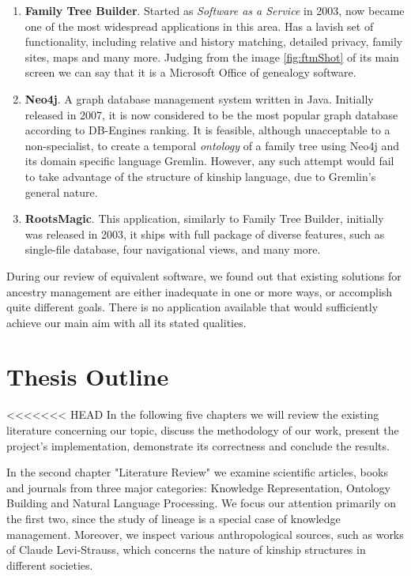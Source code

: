     \begin{enumerate}
        \item{\textbf{Family Tree Builder}. Started as \textit{Software as a Service} in 2003, now became one of the most
            widespread\cite{fambuild} applications in this area. Has a lavish set of functionality, including relative and history
            matching, detailed privacy, family sites, maps and many more. Judging from the image \ref{fig:ftmShot} of its main screen
            we can say that it is a Microsoft Office of genealogy software.}
        \item{\textbf{Neo4j}. A graph database management system\cite{neo4j} written in Java. Initially released in 2007, it is now considered
            to be the most popular graph database according to DB-Engines ranking\cite{rank}. It is feasible, although unacceptable to
            a non-specialist, to create a temporal \textit{ontology} of a family tree using Neo4j and its domain specific language
            Gremlin.  However, any such attempt would fail to take advantage of the structure of kinship language, due to Gremlin's
            general nature.}
        \item{\textbf{RootsMagic}. This application\cite{roots}, similarly to Family Tree Builder, initially was released in 2003, it
            ships with full package of diverse features, such as single-file database, four navigational views, and many more.}
    \end{enumerate}
    During our review of equivalent software, we found out that existing solutions for ancestry management are either inadequate in
    one or more ways, or accomplish quite different goals. There is no application available that would sufficiently achieve our
    main aim with all its stated qualities.

\section{Thesis Outline}
<<<<<<< HEAD
    In the following five chapters we will review the existing literature concerning our topic, discuss the methodology of our work,
    present the project's implementation, demonstrate its correctness and conclude the results.

    In the second chapter "Literature Review" we examine scientific articles, books and journals from three major categories:
    Knowledge Representation, Ontology Building and Natural Language Processing. We focus our attention primarily on the first two,
    since the study of lineage is a special case of knowledge management. Moreover, we inspect various anthropological sources, such
    as works of Claude Levi-Strauss\cite{strauss}, which concerns the nature of kinship structures in different societies.

